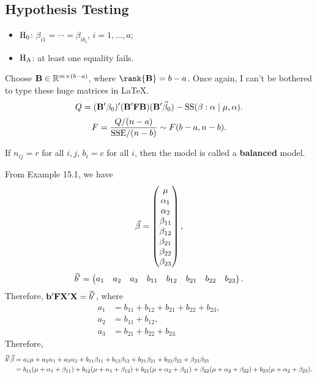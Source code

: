 \subsection*{Hypothesis Testing}
\begin{itemize}
    \item $ \text{H}_0 $: $ \beta_{i1}=\cdots=\beta_{ib_i} $, $ i=1,\ldots,a $;
    \item $ \text{H}_{\text{A}} $: at least one equality fails.
\end{itemize}
Choose
$ \mathbf{B}\in\mathbb{R}^{m\times(b-a)} $, where $ \rank{\Matrix{B}}=b-a $. Once again,
I can't be bothered to type these huge matrices in \LaTeX{}.
\[ Q=(\mathbf{B}'\beta_0)'(\mathbf{B}'\mathbf{F}\mathbf{B})(\mathbf{B}'\vec{\beta}_0)-\text{SS}(\beta:\alpha\mid \mu,\alpha).  \]
\[ F=\frac{Q/(n-a)}{\text{SSE}/(n-b)} \sim F(b-a,n-b). \]
\begin{Remark}{}{}
    If $ n_{ij}=r $ for all $ i,j $, $ b_i=c $ for all $ i $, then the model
    is called a \textbf{balanced} model.
\end{Remark}
From Example 15.1, we have
\[ \vec{\beta}=\begin{pmatrix}
        \mu        \\
        \alpha_1   \\
        \alpha_2   \\
        \beta_{11} \\
        \beta_{12} \\
        \beta_{21} \\
        \beta_{22} \\
        \beta_{23}
    \end{pmatrix}, \]
\[ \vec{b}'=\begin{pmatrix}
        a_1 & a_2 & a_3 & b_{11} & b_{12} & b_{21} & b_{22} & b_{23}
    \end{pmatrix}. \]
Therefore, $ \mathbf{b}'\mathbf{F}\mathbf{X}'\mathbf{X}=\vec{b}' $, where
\begin{align*}
    a_1 & = b_{11} + b_{12} + b_{21} + b_{22} + b_{23}, \\
    a_2 & =b_{11} +b_{12},                              \\
    a_3 & =b_{21}+b_{22}+b_{23.}
\end{align*}
Therefore,
\begin{align*}
    \vec{b}'\vec{\beta}
     & =a_1\mu+a_2\alpha_1+a_3\alpha_2+b_{11}\beta_{11}+b_{12}\beta_{12}+b_{21}\beta_{21}
    +b_{22}\beta_{22}+\beta_{23}\beta_{23}                                                                                                                                   \\
     & =b_{11}(\mu+\alpha_1+\beta_{11})+b_{12}(\mu+\alpha_1+\beta_{12})+b_{21}(\mu+\alpha_2+\beta_{21})+\beta_{22}(\mu+\alpha_2+\beta_{22})+b_{23}(\mu+\alpha_2+\beta_{23}).
\end{align*}